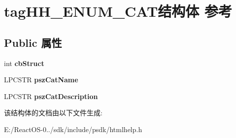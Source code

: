 \hypertarget{structtag_h_h___e_n_u_m___c_a_t}{}\section{tag\+H\+H\+\_\+\+E\+N\+U\+M\+\_\+\+C\+A\+T结构体 参考}
\label{structtag_h_h___e_n_u_m___c_a_t}
\subsection*{Public 属性}
\begin{DoxyCompactItemize}
\item 
\mbox{\label{structtag_h_h___e_n_u_m___c_a_t_a3f0027a51fa7f26ca6b7a3c14d4cc551}} 
int {\bfseries cb\+Struct}
\item 
\mbox{\label{structtag_h_h___e_n_u_m___c_a_t_add6ac9742d09b01f0fa4f453feb2dcf4}} 
L\+P\+C\+S\+TR {\bfseries psz\+Cat\+Name}
\item 
\mbox{\label{structtag_h_h___e_n_u_m___c_a_t_abdf2d06cc862e080a0555b9dcf330235}} 
L\+P\+C\+S\+TR {\bfseries psz\+Cat\+Description}
\end{DoxyCompactItemize}


该结构体的文档由以下文件生成\+:\begin{DoxyCompactItemize}
\item 
E\+:/\+React\+O\+S-\/0../sdk/include/psdk/htmlhelp.\+h\end{DoxyCompactItemize}

